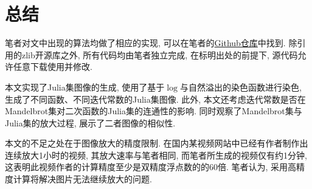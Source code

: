 \documentclass[UTF8]{ctexart}
\begin{document}
\section{总结}

笔者对文中出现的算法均做了相应的实现, 可以在笔者的\href{https://Github.com/EbolaEmperor/MathSoftware/tree/main/Final}{Github仓库}中找到. 除引用的zlib开源库之外, 所有代码均由笔者独立完成, 在标明出处的前提下, 源代码允许任意下载使用并修改. 

本文实现了Julia集图像的生成, 使用了基于$\log$与自然溢出的染色函数进行染色, 生成了不同函数、不同迭代常数的Julia集图像. 此外, 本文还考虑迭代常数是否在Mandelbrot集对二次函数的Julia集的连通性的影响. 同时观察了Mandelbrot集与Julia集的放大过程, 展示了二者图像的相似性.

本文的不足之处在于图像放大的精度限制. 在国内某视频网站中已经有作者制作出连续放大1小时的视频, 其放大速率与笔者相同, 而笔者所生成的视频仅有约1分钟, 这表明此视频作者的计算精度至少是双精度浮点数的的60倍. 笔者认为, 采用高精度计算将解决图片无法继续放大的问题.



\end{document}
